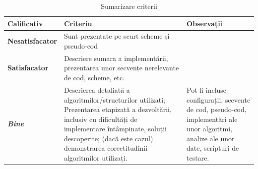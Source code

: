\documentclass[12pt,a4paper]{report}
\begin{document}
\begin{table}[th]\small\linespread{1}
	\caption{Sumarizare criterii}
	\label{tab:criterii}
	\begin{tabular}{l >{\raggedright\arraybackslash}p{8cm} >{\raggedright\arraybackslash}p{4cm}}
		\textbf{Calificativ}    & \textbf{Criteriu}                                                                                                                                                                                                                                & \textbf{Observații}                                                                                                                     \\\hline
		\textbf{Nesatisfacator} & Sunt prezentate pe scurt scheme și pseudo-cod                                                                                                                                                                                                    &                                                                                                                                         \\\hline
		\textbf{Satisfacator}   & Descriere sumara a implementării, prezentarea unor secvențe nerelevante de cod, scheme, etc.                                                                                                                                                     &                                                                                                                                         \\
		\hline
		\textbf{\textit{Bine}}  & Descrierea detaliată a algoritmilor/structurilor utilizați; Prezentarea etapizată a dezvoltării, inclusiv cu dificultăți de implementare întâmpinate, soluții descoperite; (dacă este cazul) demonstrarea corectitudinii algoritmilor utilizați. & Pot fi incluse configurații, secvente de cod, pseudo-cod, implementări ale unor algoritmi, analize ale unor date, scripturi de testare. \\
		\hline
	\end{tabular}
\end{table}
\end{document}
